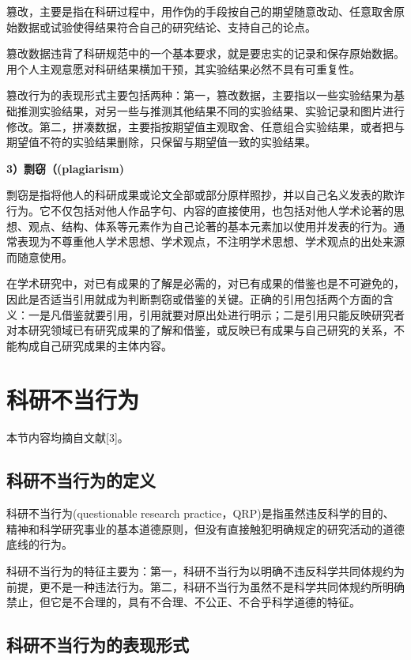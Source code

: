 篡改，主要是指在科研过程中，用作伪的手段按自己的期望随意改动、任意取舍原始数据或试验使得结果符合自己的研究结论、支持自己的论点。

篡改数据违背了科研规范中的一个基本要求，就是要忠实的记录和保存原始数据。用个人主观意愿对科研结果横加干预，其实验结果必然不具有可重复性。

篡改行为的表现形式主要包括两种：第一，篡改数据，主要指以一些实验结果为基础推测实验结果，对另一些与推测其他结果不同的实验结果、实验记录和图片进行修改。第二，拼凑数据，主要指按期望值主观取舍、任意组合实验结果，或者把与期望值不符的实验结果删除，只保留与期望值一致的实验结果。

\textbf{3）剽窃（(plagiarism)}

剽窃是指将他人的科研成果或论文全部或部分原样照抄，并以自己名义发表的欺诈行为。它不仅包括对他人作品字句、内容的直接使用，也包括对他人学术论著的思想、观点、结构、体系等元素作为自己论著的基本元素加以使用并发表的行为。通常表现为不尊重他人学术思想、学术观点，不注明学术思想、学术观点的出处来源而随意使用。

在学术研究中，对已有成果的了解是必需的，对已有成果的借鉴也是不可避免的，因此是否适当引用就成为判断剽窃或借鉴的关键。正确的引用包括两个方面的含义：一是凡借鉴就要引用，引用就要对原出处进行明示；二是引用只能反映研究者对本研究领域已有研究成果的了解和借鉴，或反映已有成果与自己研究的关系，不能构成自己研究成果的主体内容。

\section{科研不当行为}

本节内容均摘自文献[3]。

\subsection{科研不当行为的定义}

科研不当行为(questionable research practice，QRP)是指虽然违反科学的目的、精神和科学研究事业的基本道德原则，但没有直接触犯明确规定的研究活动的道德底线的行为。

科研不当行为的特征主要为：第一，科研不当行为以明确不违反科学共同体规约为前提，更不是一种违法行为。第二，科研不当行为虽然不是科学共同体规约所明确禁止，但它是不合理的，具有不合理、不公正、不合乎科学道德的特征。

\subsection{科研不当行为的表现形式}

